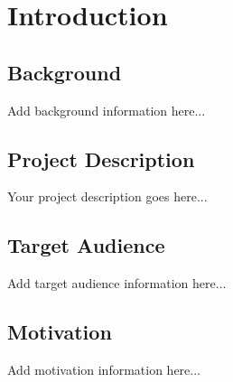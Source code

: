 \newpage
\section{Introduction}
\subsection{Background}
Add background information here...

\subsection{Project Description}
Your project description goes here...

\subsection{Target Audience}
Add target audience information here...

\subsection{Motivation}
Add motivation information here...